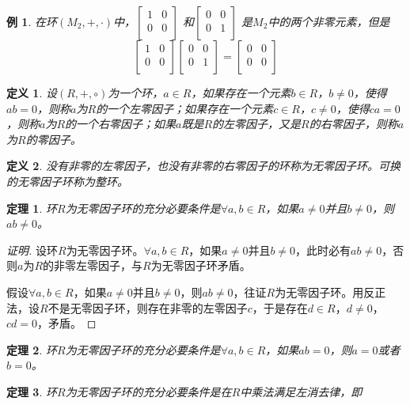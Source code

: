 \documentclass{article}
\newtheorem{Def}{定义}
\newtheorem{Thm}{定理}
\newtheorem*{Example}{例}
\begin{document}
\begin{CJK*}{UTF8}{gbsn}
  \begin{Example}
    在环$(M_2,+,\cdot)$中，$\begin{bmatrix}
      1&0\\
      0&0\\
    \end{bmatrix}$
    和$\begin{bmatrix}
      0&0\\
      0&1\\
    \end{bmatrix}$
    是$M_2$中的两个非零元素，但是\[\begin{bmatrix}
      1&0\\
      0&0\\
    \end{bmatrix}\begin{bmatrix}
      0&0\\
      0&1\\
    \end{bmatrix}=\begin{bmatrix}
      0&0\\
      0&0\\
    \end{bmatrix}\]
  \end{Example}
  
  \begin{Def}
    设$(R,+,\circ)$为一个环，$a\in R$，如果存在一个元素$b\in R$，$b\neq 0$，使得$ab=0$，则称$a$为$R$的一个左零因子；如果存在一个元素$c\in R$，$c\neq 0$，使得$ca=0$，则称$a$为$R$的一个右零因子；如果$a$既是$R$的左零因子，又是$R$的右零因子，则称$a$为$R$的零因子。
  \end{Def}
  
  \begin{Def}
    没有非零的左零因子，也没有非零的右零因子的环称为无零因子环。可换的无零因子环称为整环。
  \end{Def}
  
  \begin{Thm}
    环$R$为无零因子环的充分必要条件是$\forall a,b \in R$，如果$a\neq 0$并且$b\neq 0$，则$ab\neq 0$。
  \end{Thm}
  \begin{proof}[证明]
    设环$R$为无零因子环。$\forall a,b \in R$，如果$a\neq 0$并且$b\neq 0$，此时必有$ab\neq 0$，否则$a$为$R$的非零左零因子，与$R$为无零因子环矛盾。

    假设$\forall a,b \in R$，如果$a\neq 0$并且$b\neq 0$，则$ab\neq 0$，往证$R$为无零因子环。用反正法，设$R$不是无零因子环，则存在非零的左零因子$c$，于是存在$d\in R$，$d\neq 0$，$cd=0$，矛盾。
  \end{proof}
  \begin{Thm}
    环$R$为无零因子环的充分必要条件是$\forall a,b\in R$，如果$ab=0$，则$a=0$或者$b=0$。
  \end{Thm}
  \begin{Thm}
    环$R$为无零因子环的充分必要条件是在$R$中乘法满足左消去律，即
  

\end{Thm}
\end{CJK*}
\end{document}
